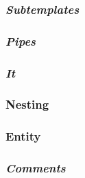 \documentclass[../relatorio.tex]{subfiles}
\begin{document}
\subsubsection{\textit{Subtemplates}} \label{subsec:subt}


\subsubsection{\textit{Pipes}} \label{subsec:pipes}


\subsubsection{\textit{It}}\label{subsec:it}


\subsubsection{Nesting}
 \label{subsec:nest}

\subsubsection{Entity}
 \label{subsec:entity}

\subsubsection{\textit{Comments}} \label{subsec:comments}

\end{document}
